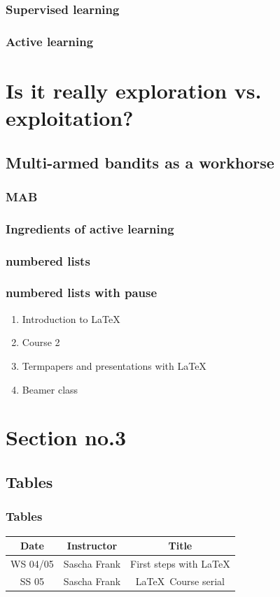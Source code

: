 \documentclass{beamer}
\begin{document}
  \begin{frame}
    \frametitle{Supervised learning}
  \end{frame}

  \begin{frame}
    \frametitle{Active learning}
  \end{frame}


\section{Is it really exploration vs. exploitation?} 
\subsection{Multi-armed bandits as a workhorse}
  \begin{frame}
  \frametitle{MAB}
  \end{frame}

  \begin{frame}
  \frametitle{Ingredients of active learning}
  \end{frame}

  \begin{frame}
  \frametitle{numbered lists}
  \end{frame}

\begin{frame}\frametitle{numbered lists with pause}
\begin{enumerate}
\item Introduction to  \LaTeX \pause 
\item Course 2 \pause 
\item Termpapers and presentations with \LaTeX \pause 
\item Beamer class
\end{enumerate}
\end{frame}

\section{Section no.3} 
\subsection{Tables}
\begin{frame}\frametitle{Tables}
\begin{tabular}{|c|c|c|}
\hline
\textbf{Date} & \textbf{Instructor} & \textbf{Title} \\
\hline
WS 04/05 & Sascha Frank & First steps with  \LaTeX  \\
\hline
SS 05 & Sascha Frank & \LaTeX \ Course serial \\
\hline
\end{tabular}
\end{frame}
\end{document}
